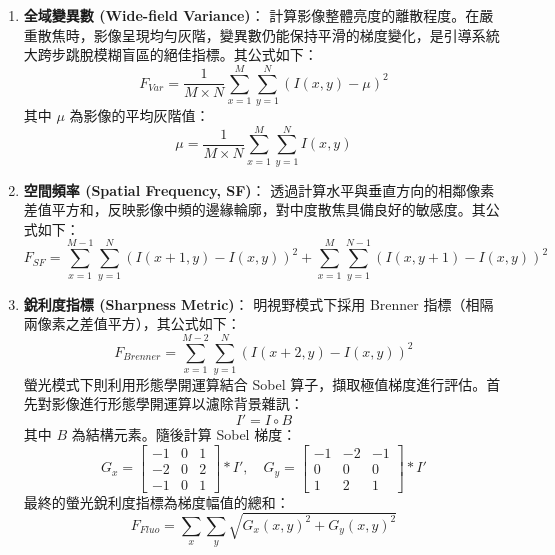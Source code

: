 \begin{enumerate}
    \item \textbf{全域變異數 (Wide-field Variance)}：
    計算影像整體亮度的離散程度。在嚴重散焦時，影像呈現均勻灰階，變異數仍能保持平滑的梯度變化，是引導系統大跨步跳脫模糊盲區的絕佳指標。其公式如下：
    \begin{equation}
        F_{Var} = \frac{1}{M \times N} \sum_{x=1}^{M} \sum_{y=1}^{N} (I(x,y) - \mu)^2
    \end{equation}
    其中 $\mu$ 為影像的平均灰階值：
    \begin{equation}
        \mu = \frac{1}{M \times N} \sum_{x=1}^{M} \sum_{y=1}^{N} I(x,y)
    \end{equation}

    \item \textbf{空間頻率 (Spatial Frequency, SF)}：
    透過計算水平與垂直方向的相鄰像素差值平方和，反映影像中頻的邊緣輪廓，對中度散焦具備良好的敏感度。其公式如下：
    \begin{equation}
        F_{SF} = \sum_{x=1}^{M-1} \sum_{y=1}^{N} (I(x+1,y) - I(x,y))^2 + \sum_{x=1}^{M} \sum_{y=1}^{N-1} (I(x,y+1) - I(x,y))^2
    \end{equation}

    \item \textbf{銳利度指標 (Sharpness Metric)}：
    明視野模式下採用 Brenner 指標（相隔兩像素之差值平方），其公式如下：
    \begin{equation}
        F_{Brenner} = \sum_{x=1}^{M-2} \sum_{y=1}^{N} (I(x+2,y) - I(x,y))^2
    \end{equation}
    螢光模式下則利用形態學開運算結合 Sobel 算子，擷取極值梯度進行評估。首先對影像進行形態學開運算以濾除背景雜訊：
    \begin{equation}
        I' = I \circ B
    \end{equation}
    其中 $B$ 為結構元素。隨後計算 Sobel 梯度：
    \begin{equation}
        G_x = \begin{bmatrix} -1 & 0 & 1 \\ -2 & 0 & 2 \\ -1 & 0 & 1 \end{bmatrix} * I', \quad G_y = \begin{bmatrix} -1 & -2 & -1 \\ 0 & 0 & 0 \\ 1 & 2 & 1 \end{bmatrix} * I'
    \end{equation}
    最終的螢光銳利度指標為梯度幅值的總和：
    \begin{equation}
        F_{Fluo} = \sum_{x} \sum_{y} \sqrt{G_x(x,y)^2 + G_y(x,y)^2}
    \end{equation}
\end{enumerate}

